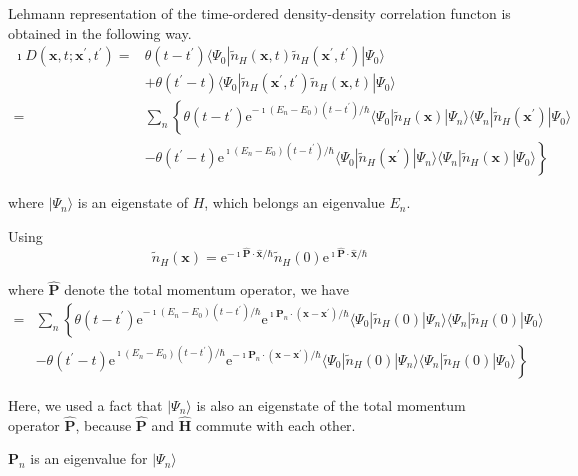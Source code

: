 Lehmann representation of the time-ordered density-density correlation functon is obtained in the following way.
\[ \begin{split}
\imath D(\mathbf{x},t;\mathbf{x}^{'},t^{'}) =& \theta(t-t^{'}) \langle \Psi_0 | \tilde{n}_H(\mathbf{x},t) \tilde{n}_H(\mathbf{x}^{'},t^{'}) | \Psi_0 \rangle\\
&+\theta(t^{'}-t) \langle \Psi_0 | \tilde{n}_H(\mathbf{x}^{'},t^{'}) \tilde{n}_H(\mathbf{x},t) | \Psi_0 \rangle\\
=& \sum_n\left\{ \theta(t-t^{'})\mathrm{e}^{-\imath (E_n-E_0)(t-t^{'})/\hbar} \langle \Psi_0 | \tilde{n}_H(\mathbf{x})|\Psi_n \rangle \langle \Psi_n | \tilde{n}_H(\mathbf{x}^{'})|\Psi_0 \rangle \right.\\
&\left. -\theta(t^{'}-t)\mathrm{e}^{\imath (E_n-E_0)(t-t^{'})/\hbar} \langle \Psi_0 | \tilde{n}_H(\mathbf{x}^{'})|\Psi_n \rangle \langle \Psi_n | \tilde{n}_H(\mathbf{x})|\Psi_0 \rangle \right\}
\end{split} \]

where $|\Psi_n \rangle$ is an eigenstate of $H$, which belongs an eigenvalue $E_n$.

Using
\[ \tilde{n}_H(\mathbf{x}) = \mathrm{e}^{-\imath \hat{\mathbf{P}}\cdot\hat{\mathbf{x}}/\hbar} \tilde{n}_H(0)\mathrm{e}^{\imath\hat{\mathbf{P}} \cdot \hat{\mathbf{x}}/\hbar} \]

where $\hat{\mathbf{P}}$ denote the total momentum operator, we have
\[ \begin{split}
=& \sum_n\left\{ \theta(t-t^{'})\mathrm{e}^{-\imath (E_n-E_0)(t-t^{'})/\hbar} \mathrm{e}^{\imath \mathbf{P}_n \cdot (\mathbf{x}-\mathbf{x}^{'})/\hbar} \langle \Psi_0 | \tilde{n}_H(0)|\Psi_n \rangle \langle \Psi_n | \tilde{n}_H(0)|\Psi_0 \rangle \right.\\
&\left. -\theta(t^{'}-t)\mathrm{e}^{\imath (E_n-E_0)(t-t^{'})/\hbar}  \mathrm{e}^{-\imath \mathbf{P}_n \cdot (\mathbf{x}-\mathbf{x}^{'})/\hbar} \langle \Psi_0 | \tilde{n}_H(0)|\Psi_n \rangle \langle \Psi_n | \tilde{n}_H(0)|\Psi_0 \rangle \right\}
\end{split} \]

Here, we used a fact that $|\Psi_n \rangle$ is also an eigenstate of the total momentum operator $\hat{\mathbf{P}}$, because $\hat{\mathbf{P}}$ and $\hat{\mathbf{H}}$ commute with each other.

$\mathbf{P}_n$ is an eigenvalue for $|\Psi_n \rangle$

